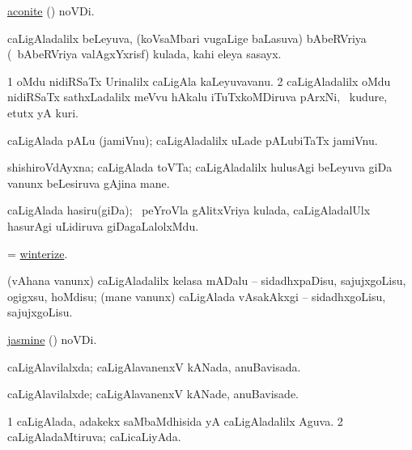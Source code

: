 \bentry
{}
\gl{\nA}
\bmng
\hyperref{kandict_a.pdf}{A}{aconite pagu}{aconite} (\pagu) noVDi. 
\emng
\eentry

\bentry
{}
\gl{\nA}
\bmng
caLigAladalilx beLeyuva, (koVsaMbari \mo vugaLige baLasuva) bAbeRVriya (\kanmu\ bAbeRVriya valAgxYxrisf) kulada, kahi eleya sasayx. 
\emng
\eentry

\bentry
{}
\gl{\nA}
\bmng
\bnum
\num{1} oMdu nidiRSaTx Urinalilx caLigAla kaLeyuvavanu. 
\num{2} caLigAladalilx oMdu nidiRSaTx sathxLadalilx meVvu hAkalu iTuTxkoMDiruva pArxNi, \kanmu\ kudure, etutx yA kuri. 
\enum
\emng
\eentry

\bentry
{}
\gl{\nA}
\bmng
caLigAlada pALu (jamiVnu); caLigAladalilx uLade pALubiTaTx jamiVnu. 
\emng
\eentry

\bentry
{}
\gl{\nA}
\bmng
shishiroVdAyxna; caLigAlada toVTa; caLigAladalilx hulusAgi beLeyuva giDa \mo vanunx beLesiruva gAjina mane. 
\emng
\eentry

\bentry
{}
\gl{\nA}
\bmng
caLigAlada hasiru(giDa); \kanmu\ peYroVla gAlitxVriya kulada, caLigAladalUlx hasurAgi uLidiruva giDagaLalolxMdu. 
\emng
\eentry

\bentry
{}
\gl{\sakirx}
\bmng
= \hyperlink{winterize}{winterize}. 
\emng
\eentry

\bentry
{}
\gl{\sakirx}
\bmng
(vAhana \mo vanunx) caLigAladalilx kelasa mADalu -- sidadhxpaDisu, sajujxgoLisu, ogigxsu, hoMdisu; (mane \mo vanunx) caLigAlada vAsakAkxgi -- sidadhxgoLisu, sajujxgoLisu. 
\emng
\eentry

\bentry
{}
\gl{\nA}
\bmng
\hyperref{kandict_j.pdf}{J}{jasmine pagu}{jasmine} (\pagu) noVDi. 
\emng
\eentry

\bentry
{}
\gl{\gu}
\bmng
caLigAlavilalxda; caLigAlavanenxV kANada, anuBavisada. 
\emng
\eentry

\bentry
{}
\gl{\kirxvi}
\bmng
caLigAlavilalxde; caLigAlavanenxV kANade, anuBavisade. 
\emng
\eentry

\bentry
{}
\gl{\gu}
\bmng
\bnum
\num{1} caLigAlada, adakekx saMbaMdhisida yA caLigAladalilx Aguva. 
\num{2} caLigAladaMtiruva; caLicaLiyAda. 
\enum
\emng
\eentry

